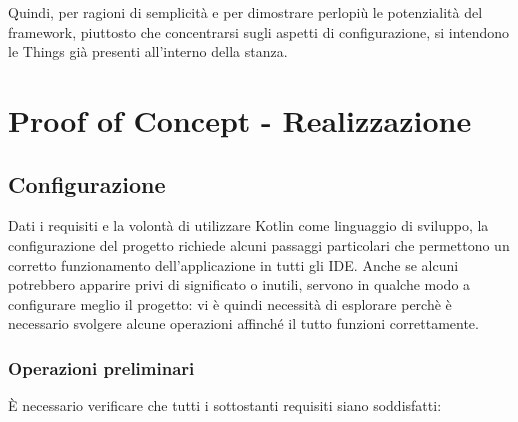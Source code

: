 \documentclass[12pt,a4paper,openright,oneside]{report}
\begin{document}
Quindi, per ragioni di semplicità e per dimostrare perlopiù le potenzialità del framework, piuttosto che concentrarsi sugli aspetti di configurazione, si intendono le Things già presenti all'interno della stanza.



\clearpage{\pagestyle{empty}\cleardoublepage}
\chapter{Proof of Concept - Realizzazione}           %
\lhead[\fancyplain{}{\bfseries\thepage}]{\fancyplain{}{\bfseries\rightmark}}  


\section{Configurazione}
Dati i requisiti e la volontà di utilizzare Kotlin come linguaggio di sviluppo, la configurazione del progetto richiede alcuni passaggi particolari che permettono un corretto funzionamento dell'applicazione in tutti gli IDE. Anche se alcuni potrebbero apparire privi di significato o inutili, servono in qualche modo a configurare meglio il progetto: vi è quindi necessità di esplorare perchè è necessario svolgere alcune operazioni affinché il tutto funzioni correttamente.

\subsection{Operazioni preliminari}
È necessario verificare che tutti i sottostanti requisiti siano soddisfatti:
\end{document}
